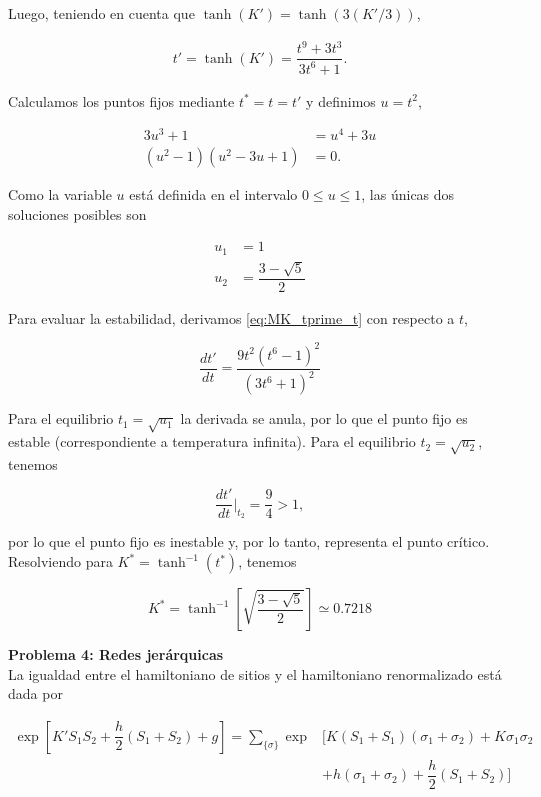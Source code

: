 \documentclass[10pt]{article}
\begin{document}
Luego, teniendo en cuenta que $\tanh(K') = \tanh(3(K'/3))$,

\begin{align} \label{eq:MK_tprime_t}
t' = \tanh(K') =  \dfrac{t^9 + 3 t^3}{3 t^6 + 1}.
\end{align}

Calculamos los puntos fijos mediante $t^*=t=t'$ y definimos $u=t^2$,

\begin{align}
3u^3+1 &= u^4 + 3 u \\
(u^2-1)(u^2-3u+1) &= 0.
\end{align}

Como la variable $u$ est\'a definida en el intervalo $0 \leq u \leq 1$, las \'unicas dos soluciones posibles son

\begin{align*}
u_1 &= 1 \\
u_2 &= \dfrac{3-\sqrt{5}}{2}
\end{align*}

Para evaluar la estabilidad, derivamos \ref{eq:MK_tprime_t} con respecto a $t$,

\begin{equation}
\dfrac{dt'}{dt} = \dfrac{9t^2 (t^6-1)^2}{(3t^6+1)^2}
\end{equation}

Para el equilibrio $t_1 = \sqrt{u_1}$ la derivada se anula, por lo que el punto fijo es estable (correspondiente a temperatura infinita). Para el equilibrio $t_2 = \sqrt{u_2}$, tenemos

\begin{equation}
\dfrac{dt'}{dt}\bigg\rvert_{t_2} = \dfrac{9}{4} > 1,
\end{equation}

por lo que el punto fijo es inestable y, por lo tanto, representa el punto cr\'itico. Resolviendo para $K^* = \tanh^{-1}(t^*)$, tenemos

\begin{equation}
K^* = \tanh^{-1}\left[\sqrt{\dfrac{3-\sqrt5}{2}} \right] \simeq 0.7218
\end{equation}

\pagebreak

\textbf{Problema 4: Redes jer\'arquicas}\\

La igualdad entre el hamiltoniano de sitios y el hamiltoniano renormalizado est\'a dada por 

\begin{align*}
\exp \left[ K' S_1 S_2 + \dfrac{h}{2}\left( S_1 + S_2\right) +g \right] = \sum_{\lbrace \sigma \rbrace} \exp &\bigg[ K(S_1 + S_1) (\sigma_1 + \sigma_2) + K \sigma_1 \sigma_2 \\
&+ h (\sigma_1 + \sigma_2) + \dfrac{h}{2} (S_1 + S_2) \bigg]
\end{align*}
\end{document}

